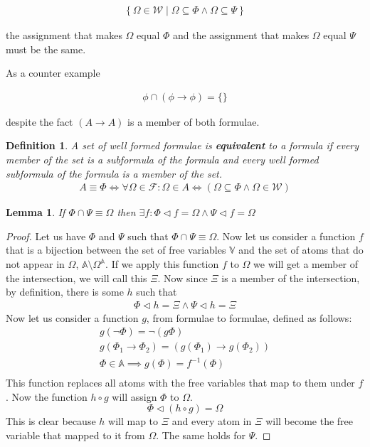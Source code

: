 \documentclass{article}
\newtheorem{lem}{Lemma}
\newtheorem{defin}{Definition}
\begin{document}
\begin{align*}
\left\{\Omega \in \mathcal{W} \mid \Omega \subseteq \Phi \land \Omega \subseteq \Psi\right\}
\end{align*}

the assignment that makes $\Omega$ equal $\Phi$ and the assignment that makes $\Omega$ equal $\Psi$ must be the same.

As a counter example

\begin{align*}
\phi \cap (\phi \rightarrow \phi) = \{\}
\end{align*}

despite the fact $(A \rightarrow A)$ is a member of both formulae.

\begin{defin}
A set of well formed formulae is \textbf{equivalent} to a formula if every member of the set is a subformula of the formula and
every well formed subformula of the formula is a member of the set.
\begin{align*}
A \equiv \Phi \iff \forall \Omega \in \mathcal{F}: \Omega \in A \iff (\Omega \subseteq \Phi \land \Omega \in \mathcal{W})
\end{align*}
\end{defin}

\begin{lem}
If $\Phi \cap \Psi \equiv \Omega$ then $\exists f: \Phi \lhd f = \Omega \land \Psi \lhd f = \Omega$
\end{lem}
\begin{proof}
Let us have $\Phi$ and $\Psi$ such that $\Phi \cap \Psi \equiv \Omega$.
Now let us consider a function $f$ that is a bijection between the set of free variables $\mathbb{V}$ and the set of atoms that do not appear in $\Omega$, $\mathbb{A}\setminus\Omega^{\mathbb{A}}$.
If we apply this function $f$ to $\Omega$ we will get a member of the intersection, we will call this $\Xi$.
Now since $\Xi$ is a member of the intersection, by definition, there is some $h$ such that
\begin{align*}
\Phi \lhd h = \Xi \land \Psi \lhd h = \Xi
\end{align*}
Now let us consider a function $g$, from formulae to formulae, defined as follows:
\begin{gather*}
g (\neg\Phi) = \neg (g \Phi) \\
g (\Phi_1 \rightarrow \Phi_2) = (g(\Phi_1)\rightarrow g(\Phi_2)) \\
\Phi \in \mathbb{A} \implies g(\Phi) = f^{-1} (\Phi)\\
\end{gather*}
This function replaces all atoms with the free variables that map to them under $f$.
Now the function $h\circ g$ will assign $\Phi$ to $\Omega$.
\begin{equation*}
\Phi \lhd (h\circ g) = \Omega
\end{equation*}
This is clear because $h$ will map to $\Xi$ and every atom in $\Xi$ will become the free variable that mapped to it from $\Omega$.
The same holds for $\Psi$.
\end{proof}
\end{document}

